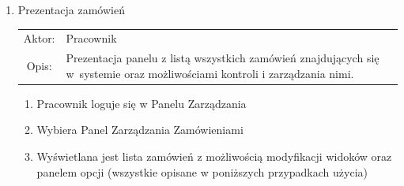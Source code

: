 \begin{enumerate}
  \item Prezentacja zamówień\\
  \begin{tabularx}{\linewidth}{ c X }
  Aktor: & Pracownik \\
  Opis: & Prezentacja panelu z listą wszystkich zamówień znajdujących się w~systemie
  oraz możliwościami kontroli i zarządzania nimi.\\
  \end{tabularx}
	\begin{enumerate}
	  \item Pracownik loguje się w Panelu Zarządzania
	  \item Wybiera Panel Zarządzania Zamówieniami
	  \item Wyświetlana jest lista zamówień z możliwością modyfikacji widoków
	  oraz panelem opcji (wszystkie opisane w poniższych przypadkach użycia)
	\end{enumerate}


\end{enumerate}
